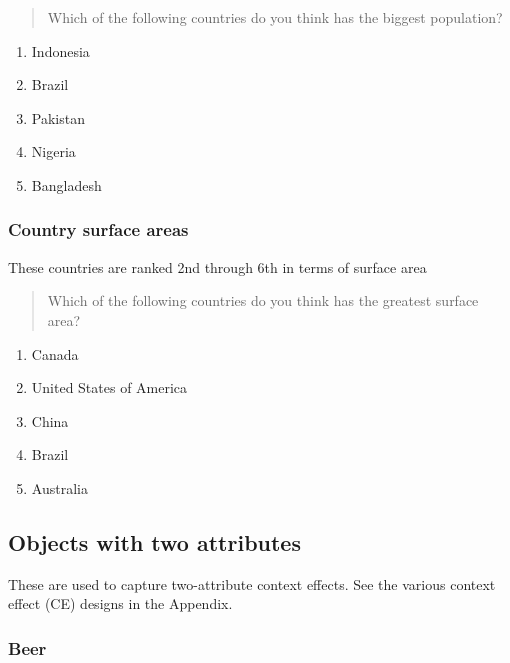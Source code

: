 \documentclass[11pt,letter]{amsart}
\begin{document}
\begin{quotation}
Which of the following countries do you think has the biggest population?
\end{quotation}

\begin{enumerate}
\item Indonesia 

\item Brazil 

\item Pakistan 

\item Nigeria 

\item Bangladesh
\end{enumerate}

\subsubsection{Country surface areas}

These countries are ranked 2nd through 6th in terms of surface area

\begin{quotation}
Which of the following countries do you think has the greatest surface area?
\end{quotation}

\begin{enumerate}
\item Canada 

\item United States of America 

\item China 

\item Brazil 

\item Australia
\end{enumerate}

\subsection{Objects with two attributes}

These are used to capture two-attribute context effects. See the various
context effect (CE) designs in the Appendix.

\subsubsection{Beer}
\end{document}
